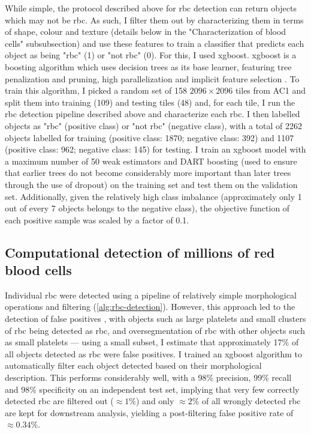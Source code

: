 While simple, the protocol described above for \ac{rbc} detection can return objects which may not be \ac{rbc}. As such, I filter them out by characterizing them in terms of shape, colour and texture (details below in the "Characterization of blood cells" subsubsection) and use these features to train a classifier that predicts each object as being "\ac{rbc}" (1) or "not \ac{rbc}" (0). For this, I used \ac{xgboost}. \ac{xgboost} is a boosting algorithm which uses decision trees as its base learner, featuring tree penalization and pruning, high parallelization and implicit feature selection \cite{Chen2016-xk}. To train this algorithm, I picked a random set of 158 $2096 \times 2096$ tiles from AC1 and split them into training (109) and testing tiles (48) and, for each tile, I run the \ac{rbc} detection pipeline described above and characterize each \ac{rbc}. I then labelled objects as "\ac{rbc}" (positive class) or "not \ac{rbc}" (negative class), with a total of 2262 objects labelled for training (positive class: 1870; negative class: 392) and 1107 (positive class: 962; negative class: 145) for testing. I train an \ac{xgboost} model with a maximum number of 50 weak estimators and DART boosting (used to ensure that earlier trees do not become considerably more important than later trees through the use of dropout) \cite{Rashmi2015-qe} on the training set and test them on the validation set. Additionally, given the relatively high class imbalance (approximately only 1 out of every 7 objects belongs to the negative class), the objective function of each positive sample was scaled by a factor of 0.1.

\subsection{Computational detection of millions of red blood cells}

Individual \ac{rbc} were detected using a pipeline of relatively simple morphological operations and filtering (\ref{alg:rbc-detection}). However, this approach led to the detection of false positives , with objects such as large platelets and small clusters of \ac{rbc} being detected as \ac{rbc}, and oversegmentation of \ac{rbc} with other objects such as small platelets --- using a small subset, I estimate that approximately 17\% of all objects detected as \ac{rbc} were false positives. I trained an \ac{xgboost} algorithm to automatically filter each object detected based on their morphological description. This performs considerably well, with a 98\% precision, 99\% recall and 98\% specificity on an independent test set, implying that very few correctly detected \ac{rbc} are filtered out ($\approx 1\%$) and only $\approx 2\%$ of all wrongly detected \ac{rbc} are kept for downstream analysis, yielding a post-filtering false positive rate of $\approx 0.34\%$. 

